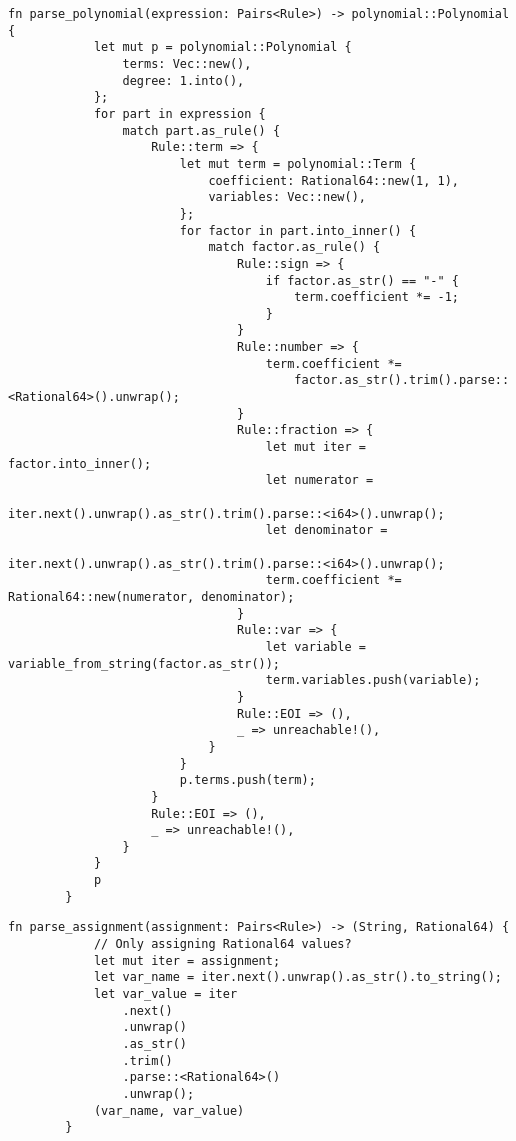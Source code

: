     \begin{lstlisting}[caption={The implementation of the \texttt{parse\_polynomial()} function}, label={lst:parse-polynomial}]
        fn parse_polynomial(expression: Pairs<Rule>) -> polynomial::Polynomial {
            let mut p = polynomial::Polynomial {
                terms: Vec::new(),
                degree: 1.into(),
            };
            for part in expression {
                match part.as_rule() {
                    Rule::term => {
                        let mut term = polynomial::Term {
                            coefficient: Rational64::new(1, 1),
                            variables: Vec::new(),
                        };
                        for factor in part.into_inner() {
                            match factor.as_rule() {
                                Rule::sign => {
                                    if factor.as_str() == "-" {
                                        term.coefficient *= -1;
                                    }
                                }
                                Rule::number => {
                                    term.coefficient *=
                                        factor.as_str().trim().parse::<Rational64>().unwrap();
                                }
                                Rule::fraction => {
                                    let mut iter = factor.into_inner();
                                    let numerator =
                                        iter.next().unwrap().as_str().trim().parse::<i64>().unwrap();
                                    let denominator =
                                        iter.next().unwrap().as_str().trim().parse::<i64>().unwrap();
                                    term.coefficient *= Rational64::new(numerator, denominator);
                                }
                                Rule::var => {
                                    let variable = variable_from_string(factor.as_str());
                                    term.variables.push(variable);
                                }
                                Rule::EOI => (),
                                _ => unreachable!(),
                            }
                        }
                        p.terms.push(term);
                    }
                    Rule::EOI => (),
                    _ => unreachable!(),
                }
            }
            p
        }
    \end{lstlisting}
    
    \begin{lstlisting}[caption={The implementation of the \texttt{parse\_assignment()} function}, label={lst:parse-assignment}]
        fn parse_assignment(assignment: Pairs<Rule>) -> (String, Rational64) {
            // Only assigning Rational64 values?
            let mut iter = assignment;
            let var_name = iter.next().unwrap().as_str().to_string();
            let var_value = iter
                .next()
                .unwrap()
                .as_str()
                .trim()
                .parse::<Rational64>()
                .unwrap();
            (var_name, var_value)
        }
    \end{lstlisting}
    
